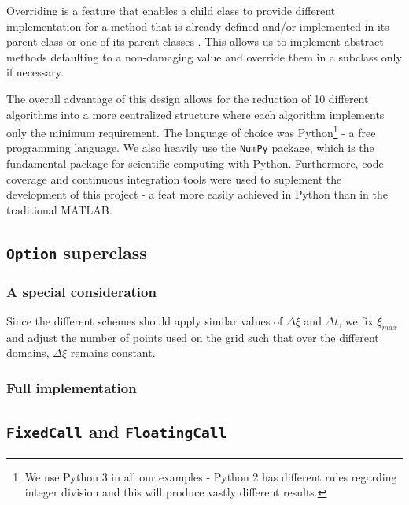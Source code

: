 \documentclass{article}
\begin{document}
Overriding is a feature that enables a child class to provide different implementation for a method that is already defined and/or implemented in its parent class or one of its parent classes \cite{oop_override}. This allows us to implement abstract methods defaulting to a non-damaging value and override them in a subclass only if necessary.

The overall advantage of this design allows for the reduction of 10 different algorithms into a more centralized structure where each algorithm implements only the minimum requirement. The language of choice was Python\footnote{We use Python 3 in all our examples - Python 2 has different rules regarding integer division and this will produce vastly different results.} - a free programming language. We also heavily use the \texttt{NumPy} package, which is the fundamental package for scientific computing with Python. Furthermore, code coverage and continuous integration tools were used to suplement the development of this project - a feat more easily achieved in Python than in the traditional MATLAB.

\normalsize

\subsection{\texttt{Option} superclass}

\subsubsection{A special consideration}
Since the different schemes should apply similar values of \(\Delta\xi\) and \(\Delta t\), we fix \(\xi_{max}\) and adjust the number of points used on the grid such that over the different domains, \(\Delta\xi\) remains constant.

\subsubsection{Full implementation}
\scriptsize

\normalsize

\subsection{\texttt{FixedCall} and \texttt{FloatingCall}}

\scriptsize

\normalsize
\end{document}
